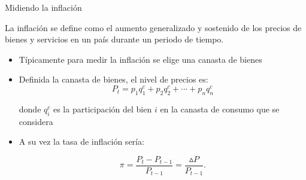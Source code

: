 \documentclass{beamer}
\begin{document}







\begin{frame}{Midiendo la inflación}
\begin{boxB}
\centering
    La inflación se define como el aumento generalizado y sostenido de los precios de bienes y servicios en un país durante un periodo de tiempo.
\end{boxB}
\begin{itemize}    
    \item Típicamente para medir la inflación se elige una canasta de bienes \vspace{1mm}
    \item Definida la canasta de bienes, el nivel de precios es: 
        \begin{equation*}
            P_t = p_1 q_1^c+ p_2 q_2^c+\cdots+p_n q_n^c
        \end{equation*}

    donde $q_i^c$ es la participación del bien $i$ en la canasta de consumo que se considera

    \item A su vez la tasa de inflación sería: 

    \begin{equation*}
        \pi =\frac{P_t - P_{t-1}}{P_{t-1}}= \frac{\vartriangle P}{P_{t-1}}.
    \end{equation*}
\end{itemize}
\end{frame}
\end{document}
